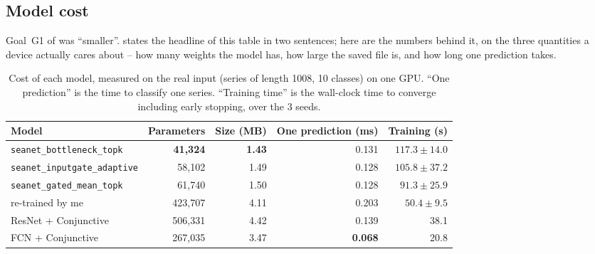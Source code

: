 \subsection{Model cost}
\label{app:cost}

Goal~G1 of  was ``smaller''.  states the headline of this
table in two sentences; here are the numbers behind it, on the three quantities a device actually
cares about -- how many weights the model has, how large the saved file is, and how long one
prediction takes.

\begin{table}[htbp]
\caption{Cost of each model, measured on the real \webtraffic{} input (series of length 1008,
10 classes) on one GPU. ``One prediction'' is the time to classify one series. ``Training time'' is
the wall-clock time to converge including early stopping, over the 3 \webtraffic{} seeds.}
\label{tab:cost}
\begin{center}
\footnotesize
\begin{tabular}{lrrrr}
\toprule
\textbf{Model} & \textbf{Parameters} & \textbf{Size (MB)} &
\textbf{One prediction (ms)} & \textbf{Training (s)} \\
\midrule
\texttt{seanet\_bottleneck\_topk}     & \textbf{41{,}324}  & \textbf{1.43} & 0.131 & $117.3\pm14.0$ \\
\texttt{seanet\_inputgate\_adaptive}  & 58{,}102  & 1.49 & 0.128 & $105.8\pm37.2$ \\
\texttt{seanet\_gated\_mean\_topk}    & 61{,}740  & 1.50 & 0.128 & $91.3\pm25.9$ \\
\millet{} re-trained by me            & 423{,}707 & 4.11 & 0.203 & $50.4\pm9.5$ \\
ResNet + Conjunctive                  & 506{,}331 & 4.42 & 0.139 & 38.1 \\
FCN + Conjunctive                     & 267{,}035 & 3.47 & \textbf{0.068} & 20.8 \\
\bottomrule
\end{tabular}
\end{center}
\end{table}

